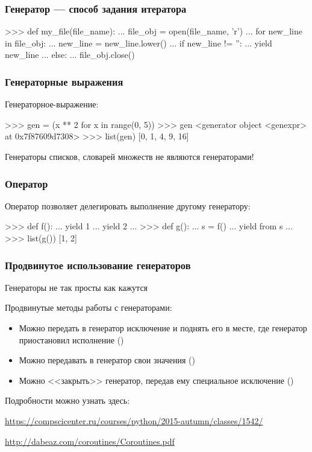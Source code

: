 \documentclass[fleqn, xcolor=x11names]{beamer}
\begin{document}
\begin{frame}[fragile]\frametitle{Генератор --- способ задания итератора}
\begin{pcode}
>>> def my_file(file_name):
...     file_obj = open(file_name, 'r')
...     for new_line in file_obj:
...         new_line = new_line.lower()
...         if new_line != '':
...             yield new_line
...         else:         
...             file_obj.close()
\end{pcode}
\end{frame}

\begin{frame}[fragile]\frametitle{Генераторные выражения}
Генераторное-выражение:

\begin{pcode}
>>> gen = (x ** 2 for x in range(0, 5))
>>> gen
<generator object <genexpr> at 0x7f87609d7308>
>>> list(gen)
[0, 1, 4, 9, 16]
\end{pcode}

\hfill

Генераторы списков, словарей множеств не являются генераторами!
\end{frame}


\begin{frame}[fragile]\frametitle{Оператор }

Оператор  позволяет делегировать выполнение
другому генератору: 
\begin{pcode}
>>> def f():
...     yield 1
...     yield 2
...    
>>> def g():
...     s = f()
...     yield from s
...
>>> list(g())
[1, 2]
\end{pcode}
\end{frame}

\begin{frame}[fragile]\frametitle{Продвинутое использование генераторов}
Генераторы не так просты как кажутся

\hfill

Продвинутые методы работы с генераторами:
\begin{itemize}
\item Можно передать в генератор исключение и поднять его в месте, где генератор приостановил исполнение ()

\item Можно передавать в генератор свои значения ()

\item Можно <<закрыть>> генератор, передав ему специальное исключение ()
\end{itemize}

\hfill

Подробности можно узнать здесь:

\href{https://compscicenter.ru/courses/python/2015-autumn/classes/1542/}{https://compscicenter.ru/courses/python/2015-autumn/classes/1542/}

\href{http://dabeaz.com/coroutines/Coroutines.pdf}{http://dabeaz.com/coroutines/Coroutines.pdf}
\end{frame}
\end{document}
